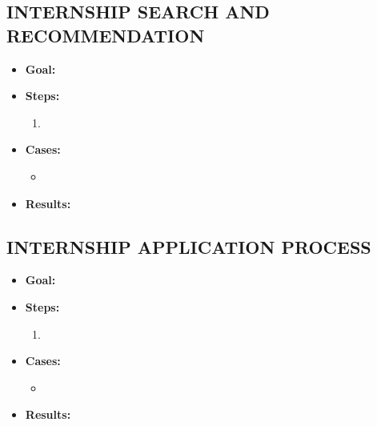 \subsection{INTERNSHIP SEARCH AND RECOMMENDATION}\label{subsec:internship-search-and-recommendation}
\begin{itemize}
    \item \textbf{Goal:}

    \item \textbf{Steps:}
    \begin{enumerate}
        \item

    \end{enumerate}
    \item \textbf{Cases:}
    \begin{itemize}
        \item
    \end{itemize}
    \item \textbf{Results:}

\end{itemize}

\subsection{INTERNSHIP APPLICATION PROCESS}\label{subsec:internship-application-process}
\begin{itemize}
    \item \textbf{Goal:}

    \item \textbf{Steps:}
    \begin{enumerate}
        \item

    \end{enumerate}
    \item \textbf{Cases:}
    \begin{itemize}
        \item
    \end{itemize}
    \item \textbf{Results:}

\end{itemize}

